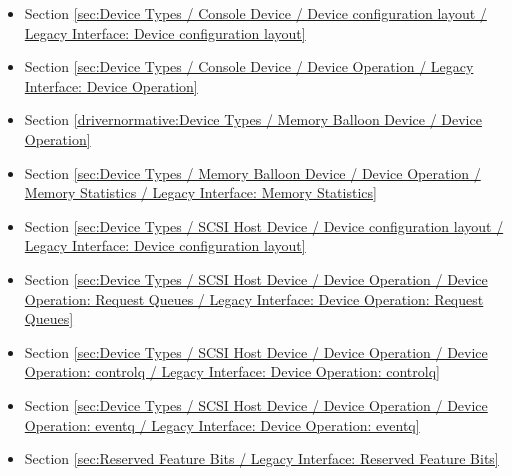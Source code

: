 \begin{itemize}
\item Section \ref{sec:Device Types / Console Device / Device configuration layout / Legacy Interface: Device configuration layout}
\item Section \ref{sec:Device Types / Console Device / Device Operation / Legacy Interface: Device Operation}
\item Section \ref{drivernormative:Device Types / Memory Balloon Device / Device Operation}
\item Section \ref{sec:Device Types / Memory Balloon Device / Device Operation / Memory Statistics / Legacy Interface: Memory Statistics}
\item Section \ref{sec:Device Types / SCSI Host Device / Device configuration layout / Legacy Interface: Device configuration layout}
\item Section \ref{sec:Device Types / SCSI Host Device / Device Operation / Device Operation: Request Queues / Legacy Interface: Device Operation: Request Queues}
\item Section \ref{sec:Device Types / SCSI Host Device / Device Operation / Device Operation: controlq / Legacy Interface: Device Operation: controlq}
\item Section \ref{sec:Device Types / SCSI Host Device / Device Operation / Device Operation: eventq / Legacy Interface: Device Operation: eventq}
\item Section \ref{sec:Reserved Feature Bits / Legacy Interface: Reserved Feature Bits}
\end{itemize}
